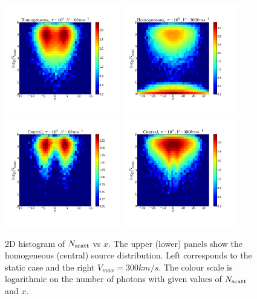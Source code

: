 \documentclass{emulateapj}
\begin{document}
\begin{figure}
\begin{center}
  \includegraphics[width=0.45\textwidth]{2dHistogram0t5HOM.png}
  \includegraphics[width=0.45\textwidth]{2dHistogram300t5HOM.png}\\
  \includegraphics[width=0.45\textwidth]{2dHistogram0t5.png}
  \includegraphics[width=0.45\textwidth]{2dHistogram300t5.png}    
\end{center}
    \caption{2D histogram of $N_{\rm scatt}$ vs $x$. The upper (lower) panels
      show the homogeneous (central) source distribution. Left
      corresponds to the static case and the right
      $V_{max}=300km/s$. The colour scale is logarithmic on the
      number of photons with given values of $N_{\rm scatt}$ and
      $x$. \label{fig:Nscatt2D}}   
\end{figure}
\end{document}
